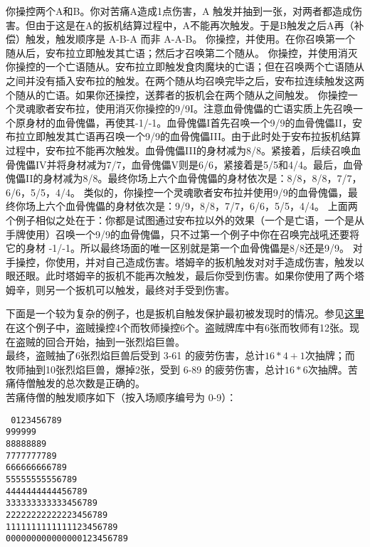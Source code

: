 \example 你操控两个A和B。你对苦痛A造成1点伤害，A 触发并抽到一张，对两者都造成伤害。但由于这是在A的扳机结算过程中，A不能再次触发。于是B触发之后A再（补偿）触发，触发顺序是 A-B-A 而非 A-A-B。
\example 你操控，并使用。在你召唤第一个随从后，安布拉立即触发其亡语；然后才召唤第二个随从。
\example 你操控，并使用消灭你操控的一个亡语随从。安布拉立即触发食肉魔块的亡语；但在召唤两个亡语随从之间并没有插入安布拉的触发。在两个随从均召唤完毕之后，安布拉连续触发这两个随从的亡语。如果你还操控，送葬者的扳机会在两个随从之间触发。
\example 你操控一个灵魂歌者安布拉，使用消灭你操控的9/9I。注意血骨傀儡的亡语实质上先召唤一个原身材的血骨傀儡，再使其-1/-1。血骨傀儡I首先召唤一个9/9的血骨傀儡II，安布拉立即触发其亡语再召唤一个9/9的血骨傀儡III。由于此时处于安布拉扳机结算过程中，安布拉不能再次触发。血骨傀儡III的身材减为8/8。紧接着，后续召唤血骨傀儡IV并将身材减为7/7，血骨傀儡V则是6/6，紧接着是5/5和4/4。最后，血骨傀儡II的身材减为8/8。最终你场上六个血骨傀儡的身材依次是：8/8，8/8，7/7，6/6，5/5，4/4。
\example 类似的，你操控一个灵魂歌者安布拉并使用9/9的血骨傀儡，最终你场上六个血骨傀儡的身材依次是：9/9，8/8，7/7，6/6，5/5，4/4。
\notice 上面两个例子相似之处在于：你都是试图通过安布拉以外的效果（一个是亡语，一个是从手牌使用）召唤一个9/9的血骨傀儡，只不过第一个例子中你在召唤完战吼还要将它的身材 -1/-1。所以最终场面的唯一区别就是第一个血骨傀儡是8/8还是9/9。
\example 对手操控，你使用，并对自己造成伤害。塔姆辛的扳机触发对对手造成伤害，触发以眼还眼。此时塔姆辛的扳机不能再次触发，最后你受到伤害。如果你使用了两个塔姆辛，则另一个扳机可以触发，最终对手受到伤害。

下面是一个较为复杂的例子，也是扳机自触发保护最初被发现时的情况。参见\href{https://www.youtube.com/watch?v=DowBB0GhGnA}{这里}\\
在这个例子中，盗贼操控4个而牧师操控6个。盗贼牌库中有6张而牧师有12张。现在盗贼的回合开始，抽到一张烈焰巨兽。\\
最终，盗贼抽了6张烈焰巨兽后受到 3-61 的疲劳伤害，总计$16*4+1$次抽牌；而牧师抽到10张烈焰巨兽，爆掉2张，受到 6-89 的疲劳伤害，总计$16*6$次抽牌。苦痛侍僧触发的总次数是正确的。\\
苦痛侍僧的触发顺序如下（按入场顺序编号为 0-9）：
\begin{center}
    \texttt{
        0123456789\\
        999999\\
        88888889\\
        7777777789\\
        666666666789\\
        55555555556789\\
        4444444444456789\\
        333333333333456789\\
        22222222222223456789\\
        1111111111111123456789\\
        000000000000000123456789
    }
\end{center}

